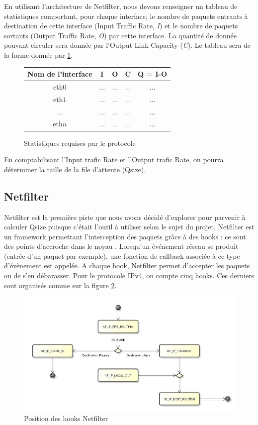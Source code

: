 \documentclass[a4paper]{article}
\begin{document}
En utilisant l'architecture de Netfilter, nous devons renseigner
un tableau de statistiques comportant, pour chaque interface, le
nombre de paquets entrants à destination de cette interface
(Input Traffic Rate, \textit{I}) et le nombre de paquets sortants
(Output Traffic Rate, \textit{O}) par cette interface. La quantité
de donnée pouvant circuler sera donnée par l'Output Link Capacity
(\textit{C}). Le tableau sera de la forme donnée par \ref{stats}.

\begin{figure}
	\centering
	\begin{tabular}{c|c|c|c|c}
		Nom de l'interface & I & O & C & Q = I-O \\
		\hline
		eth$0$ & $\ldots$ & $\ldots$ & $\ldots$ & $\ldots$ \\
		eth$1$ & $\ldots$ & $\ldots$ & $\ldots$ & $\ldots$ \\
		$\ldots$ & $\ldots$ & $\ldots$ & $\ldots$ & $\ldots$ \\
		eth$n$ & $\ldots$ & $\ldots$ & $\ldots$ & $\ldots$ \\
	\end{tabular}
	\caption{\label{stats} Statistiques requises par le protocole}
\end{figure}

En comptabilisant l'Input trafic Rate et l'Output trafic Rate,
on pourra déterminer la taille de la file d'attente (Qsize).

\subsection{Netfilter}
Netfilter est la première piste que nous avons décidé d'explorer pour 
parvenir à calculer Qsize puisque c'était l'outil à utiliser selon le sujet du projet.
Netfilter est un framework permettant l'interception des paquets
grâce à des hooks : ce sont des points d'accroche dans le noyau \cite{netfilter1}.
Lorsqu'un événement réseau se produit (entrée d'un paquet par exemple),
une fonction de callback associée à ce type d'évènement est appelée.
A chaque hook, Netfilter permet d'accepter les paquets ou de s'en
débarasser. Pour le protocole IPv4, on compte cinq hooks. Ces derniers
sont organisés comme sur la figure \ref{hooks}.

\begin{figure}[!ht]
	\centering
	\includegraphics[scale=.5]{hooks.jpg}
	\caption{\label{hooks} Position des hooks Netfilter}
\end{figure}
\end{document}

